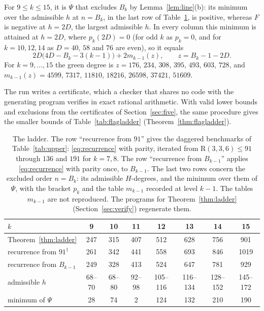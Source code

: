 \documentclass[11pt]{article}
\theoremstyle{spacedplain}
\theoremstyle{spaceddef}
\theoremstyle{spacedremark}
\newcommand{\R}{\mathrm{R}}
\begin{document}
For $9\le k\le 15$, it is $\Psi$ that excludes $B_k$ by Lemma~\ref{lem:line}(b): its minimum over the admissible $h$ at $n=B_k$, in the last row of Table~\ref{tab:ladder}, is positive, whereas $F$ is negative at $h=2D$, the largest admissible $h$.
In every column this minimum is attained at $h=2D$, where $p_k(2D)=0$ (for odd $k$ as $p_k=0$, and for $k=10,12,14$ as $D=40$, $58$ and $76$ are even), so it equals
\[
2D\big(4D-B_k-3(k-1)\big)+2m_{k-1}(z),\qquad z=B_k-1-2D.
\]
For $k=9,\dots,15$ the green degree is $z=176$, $234$, $308$, $395$, $493$, $603$, $728$, and $m_{k-1}(z)=4599$, $7317$, $11810$, $18216$, $26598$, $37421$, $51609$.

The run writes a certificate, which a checker that shares no code with the generating program verifies in exact rational arithmetic.
With valid lower bounds and exclusions from the certificates of Section~\ref{sec:five}, the same procedure gives the smaller bounds of Table~\ref{tab:flagladder} (Theorem~\ref{thm:flagladder}).

\begin{table}[htbp]
\centering\small
\begin{tabular}{l*{7}{c}}
\toprule
$k$ & 9 & 10 & 11 & 12 & 13 & 14 & 15\\
\midrule
Theorem~\ref{thm:ladder} & 247 & 315 & 407 & 512 & 628 & 756 & 901\\
recurrence from $91^\dagger$ & 261 & 342 & 441 & 558 & 693 & 846 & 1019\\
recurrence from $B_{k-1}$ & 249 & 328 & 413 & 524 & 647 & 781 & 929\\
admissible $h$ & 68--70 & 68--80 & 92--98 & 105--116 & 116--134 & 128--152 & 145--172\\
minimum of $\Psi$ & 28 & 74 & 2 & 124 & 132 & 210 & 190\\
\bottomrule
\end{tabular}
\caption{The ladder.
The row ``recurrence from $91$'' gives the daggered benchmarks of Table~\ref{tab:upper}: \eqref{eq:recurrence} with parity, iterated from $\R(3,3,6)\le 91$ \cite{Rad26} through $136$ and $191$ for $k=7,8$.
The row ``recurrence from $B_{k-1}$'' applies \eqref{eq:recurrence} with parity once, to $B_{k-1}$.
The last two rows concern the excluded order $n=B_k$: its admissible $H$-degrees, and the minimum over them of $\Psi$, with the bracket $p_k$ and the table $m_{k-1}$ recorded at level $k-1$.
The tables $m_{k-1}$ are not reproduced.
The programs for Theorem~\ref{thm:ladder} (Section~\ref{sec:verify}) regenerate them.}
\label{tab:ladder}
\end{table}
\end{document}
